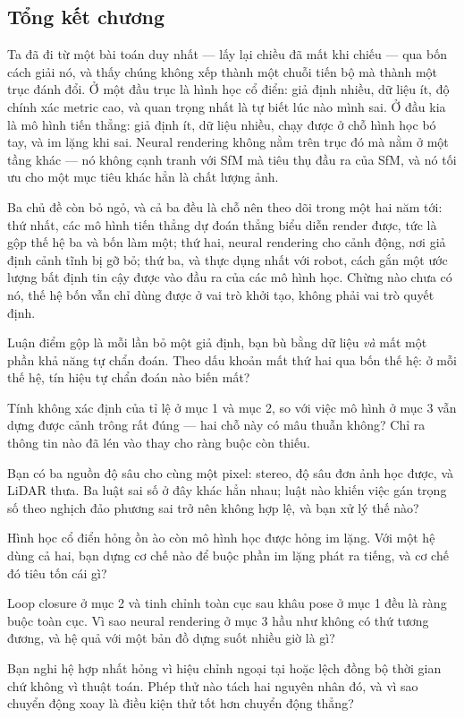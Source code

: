 \documentclass[../../deep_learning.tex]{subfiles}
\begin{document}
\subsection*{Tổng kết chương}
Ta đã đi từ một bài toán duy nhất --- lấy lại chiều đã mất khi chiếu --- qua bốn cách giải nó, và thấy chúng không xếp thành một chuỗi tiến bộ mà thành một trục đánh đổi. Ở một đầu trục là hình học cổ điển: giả định nhiều, dữ liệu ít, độ chính xác metric cao, và quan trọng nhất là tự biết lúc nào mình sai. Ở đầu kia là mô hình tiến thẳng: giả định ít, dữ liệu nhiều, chạy được ở chỗ hình học bó tay, và im lặng khi sai. Neural rendering không nằm trên trục đó mà nằm ở một tầng khác --- nó không cạnh tranh với SfM mà tiêu thụ đầu ra của SfM, và nó tối ưu cho một mục tiêu khác hẳn là chất lượng ảnh.

Ba chủ đề còn bỏ ngỏ, và cả ba đều là chỗ nên theo dõi trong một hai năm tới: thứ nhất, các mô hình tiến thẳng dự đoán thẳng biểu diễn render được, tức là gộp thế hệ ba và bốn làm một; thứ hai, neural rendering cho cảnh động, nơi giả định cảnh tĩnh bị gỡ bỏ; thứ ba, và thực dụng nhất với robot, cách gắn một ước lượng bất định tin cậy được vào đầu ra của các mô hình học. Chừng nào chưa có nó, thế hệ bốn vẫn chỉ dùng được ở vai trò khởi tạo, không phải vai trò quyết định.
\begin{tukiem}
\item Luận điểm gộp là mỗi lần bỏ một giả định, bạn bù bằng dữ liệu \emph{và} mất một phần khả năng tự chẩn đoán. Theo dấu khoản mất thứ hai qua bốn thế hệ: ở mỗi thế hệ, tín hiệu tự chẩn đoán nào biến mất?
\item Tính không xác định của tỉ lệ ở mục 1 và mục 2, so với việc mô hình ở mục 3 vẫn dựng được cảnh trông rất đúng --- hai chỗ này có mâu thuẫn không? Chỉ ra thông tin nào đã lén vào thay cho ràng buộc còn thiếu.
\item Bạn có ba nguồn độ sâu cho cùng một pixel: stereo, độ sâu đơn ảnh học được, và LiDAR thưa. Ba luật sai số ở đây khác hẳn nhau; luật nào khiến việc gán trọng số theo nghịch đảo phương sai trở nên không hợp lệ, và bạn xử lý thế nào?
\item Hình học cổ điển hỏng ồn ào còn mô hình học được hỏng im lặng. Với một hệ dùng cả hai, bạn dựng cơ chế nào để buộc phần im lặng phát ra tiếng, và cơ chế đó tiêu tốn cái gì?
\item Loop closure ở mục 2 và tinh chỉnh toàn cục sau khâu pose ở mục 1 đều là ràng buộc toàn cục. Vì sao neural rendering ở mục 3 hầu như không có thứ tương đương, và hệ quả với một bản đồ dựng suốt nhiều giờ là gì?
\item Bạn nghi hệ hợp nhất hỏng vì hiệu chỉnh ngoại tại hoặc lệch đồng bộ thời gian chứ không vì thuật toán. Phép thử nào tách hai nguyên nhân đó, và vì sao chuyển động xoay là điều kiện thử tốt hơn chuyển động thẳng?
\end{tukiem}
\ifSubfilesClassLoaded{\printbibliography[title={Nguồn}]}{}
\end{document}
